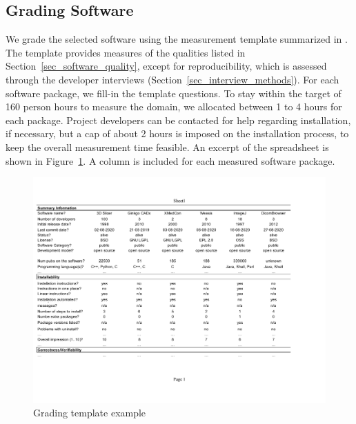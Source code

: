 \documentclass[final, 3p, times, authoryear]{elsarticle}
\begin{document}
\subsection{Grading Software} \label{sec_grading_software}

We grade the selected software using the measurement template summarized in
\citet{SmithEtAl2021}.  The template provides measures of the qualities listed
in Section~\ref{sec_software_quality}, except for reproducibility, which is
assessed through the developer interviews (Section~\ref{sec_interview_methods}).
For each software package, we fill-in the template questions. To stay within the
target of 160 person hours to measure the domain, we allocated between 1 to 4
hours for each package. Project developers can be contacted for help regarding
installation, if necessary, but a cap of about 2 hours is imposed on the
installation process, to keep the overall measurement time feasible. An excerpt
of the spreadsheet is shown in Figure~\ref{fg_grading_template_example}.  A
column is included for each measured software package.

\begin{figure}[!ht]
\includegraphics[scale=0.67]{figures/template.pdf}
\caption{Grading template example}
\label{fg_grading_template_example}
\end{figure}
\end{document}
